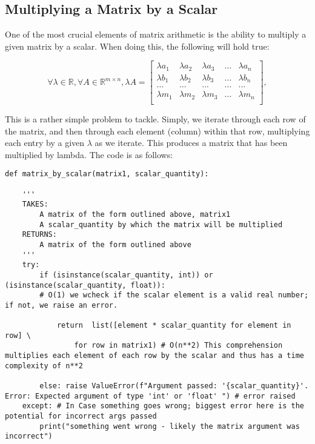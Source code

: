 \documentclass[12pt, a4paper]{article}
\begin{document}
\subsection{Multiplying a Matrix by a Scalar}

One of the most crucial elements of matrix arithmetic is the ability to multiply a given matrix by a scalar. 
When doing this, the following will hold true:

\begin{equation*}
    \forall \lambda \in \mathbb{R}, \forall A \in \mathbb{R}^{m\times n},  \lambda A = 
    \begin{bmatrix}
        \lambda a_{1}  & \lambda a_{2} &  \lambda a_{3} & ... & \lambda a_{n}\\
        \lambda b_{1}  & \lambda b_{2} & \lambda b_{3} & ... & \lambda b_{n}\\
        ...  & ...& ... & ... & ...\\
        \lambda m_{1}  & \lambda m_{2} & \lambda m_{3} & ... & \lambda m_{n}\\
    \end{bmatrix},
\end{equation*}

This is a rather simple problem to tackle. Simply, we iterate through each row of the matrix, and then through each
element (column) within that row, multiplying each entry by a given $\lambda$ as we iterate. 
This produces a matrix that has been multiplied by lambda. The code is as follows: \newline

\begin{lstlisting}
def matrix_by_scalar(matrix1, scalar_quantity):
    
    '''
    TAKES: 
        A matrix of the form outlined above, matrix1
        A scalar_quantity by which the matrix will be multiplied
    RETURNS:
        A matrix of the form outlined above
    '''
    try:
        if (isinstance(scalar_quantity, int)) or (isinstance(scalar_quantity, float)): 
        # O(1) we wcheck if the scalar element is a valid real number; if not, we raise an error.

            return  list([element * scalar_quantity for element in row] \
                for row in matrix1) # O(n**2) This comprehension multiplies each element of each row by the scalar and thus has a time complexity of n**2
    
        else: raise ValueError(f"Argument passed: '{scalar_quantity}'. Error: Expected argument of type 'int' or 'float' ") # error raised
    except: # In Case something goes wrong; biggest error here is the potential for incorrect args passed
        print("something went wrong - likely the matrix argument was incorrect") 

\end{lstlisting}
\end{document}
